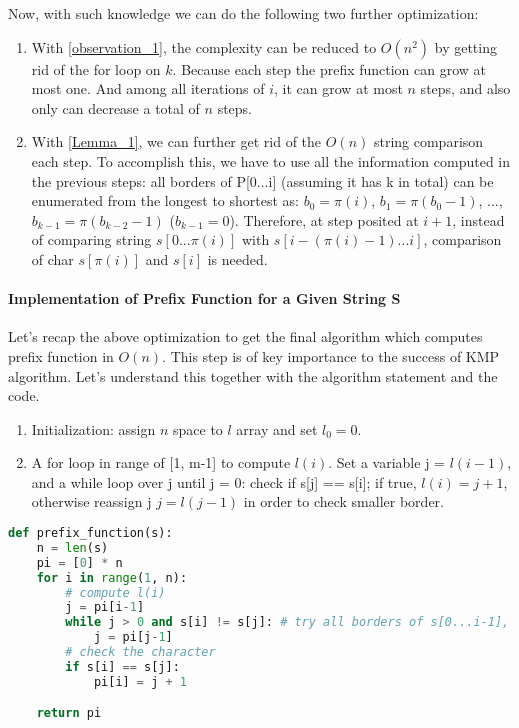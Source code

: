 \documentclass[../main.tex]{subfiles}
\begin{document}
Now, with such knowledge we can do the following two further optimization:
\begin{enumerate}
    \item With \ref{observation_1}, the complexity can be reduced to $O(n^2)$ by getting rid of the for loop on $k$. Because each step the prefix function can grow at most one. And among all iterations of $i$, it can grow at most $n$ steps, and also only can decrease a total of $n$ steps. 
    \item With \ref{Lemma_1}, we can further get rid of the $O(n)$ string comparison each step. To accomplish this, we have to use all the information computed in the previous steps: all borders of P[0...i] (assuming it has k in total) can be enumerated from the longest to shortest as: $b_0 = \pi(i)$, $b_1 = \pi(b_0-1)$, ..., $b_{k-1} = \pi(b_{k-2}-1)$ ($b_{k-1} = 0$). Therefore, at step posited at $i+1$, instead of comparing string $s[0...\pi(i)]$ with $s[i-(\pi(i)-1)...i]$, comparison of char $s[\pi(i)]$ and $s[i]$ is needed.
\end{enumerate}



\paragraph{Implementation of Prefix Function for a Given String S} Let's recap the above optimization to get the final algorithm which computes prefix function in $O(n)$. This step is of key importance to the success of KMP algorithm. Let's understand this together with the algorithm statement and the code. 
\begin{enumerate}
    \item Initialization: assign $n$ space to $l$ array and set $l_0 = 0$. 
    \item A for loop in range of [1, m-1] to compute $l(i)$. Set a variable j = $l(i-1)$, and a while loop over j until j = 0: check if s[j] == s[i]; if true, $l(i)=j+1$, otherwise reassign j $j = l(j-1)$ in order to check smaller border.
\end{enumerate}
\begin{lstlisting}[language=Python]
def prefix_function(s):
    n = len(s)
    pi = [0] * n
    for i in range(1, n):
        # compute l(i)
        j = pi[i-1]
        while j > 0 and s[i] != s[j]: # try all borders of s[0...i-1], from the longest to the shortest
            j = pi[j-1]
        # check the character
        if s[i] == s[j]:
            pi[i] = j + 1

    return pi
\end{lstlisting}
\end{document}
